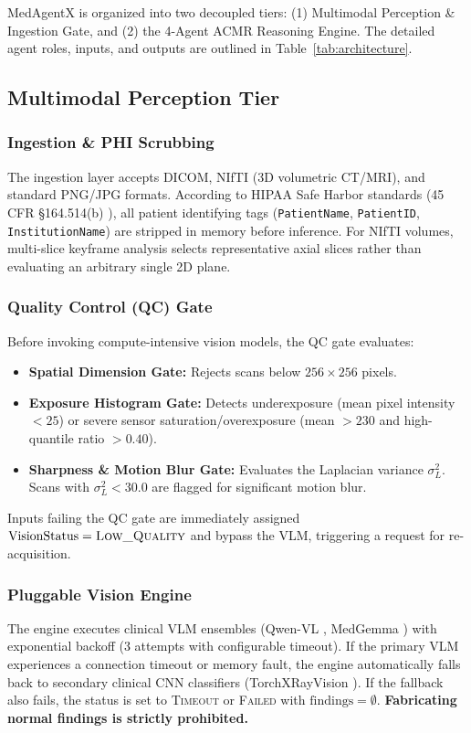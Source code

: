 \documentclass[journal,10pt,twocolumn]{IEEEtran}
\begin{document}
MedAgentX is organized into two decoupled tiers: (1) Multimodal Perception \& Ingestion Gate, and (2) the 4-Agent ACMR Reasoning Engine. The detailed agent roles, inputs, and outputs are outlined in Table~\ref{tab:architecture}.

\subsection{Multimodal Perception Tier}
\subsubsection{Ingestion \& PHI Scrubbing}
The ingestion layer accepts DICOM, NIfTI (3D volumetric CT/MRI), and standard PNG/JPG formats. According to HIPAA Safe Harbor standards (45 CFR \S 164.514(b) \cite{hipaa2002safeharbor}), all patient identifying tags (\texttt{PatientName}, \texttt{PatientID}, \texttt{InstitutionName}) are stripped in memory before inference. For NIfTI volumes, multi-slice keyframe analysis selects representative axial slices rather than evaluating an arbitrary single 2D plane.

\subsubsection{Quality Control (QC) Gate}
Before invoking compute-intensive vision models, the QC gate evaluates:
\begin{itemize}
    \item \textbf{Spatial Dimension Gate:} Rejects scans below $256 \times 256$ pixels.
    \item \textbf{Exposure Histogram Gate:} Detects underexposure (mean pixel intensity $< 25$) or severe sensor saturation/overexposure (mean $> 230$ and high-quantile ratio $> 0.40$).
    \item \textbf{Sharpness \& Motion Blur Gate:} Evaluates the Laplacian variance $\sigma^2_L$. Scans with $\sigma^2_L < 30.0$ are flagged for significant motion blur.
\end{itemize}
Inputs failing the QC gate are immediately assigned $\text{VisionStatus} = \textsc{Low\_Quality}$ and bypass the VLM, triggering a request for re-acquisition.

\subsubsection{Pluggable Vision Engine}
The engine executes clinical VLM ensembles (Qwen-VL \cite{bai2023qwenvl}, MedGemma \cite{medgemma2024}) with exponential backoff (3 attempts with configurable timeout). If the primary VLM experiences a connection timeout or memory fault, the engine automatically falls back to secondary clinical CNN classifiers (TorchXRayVision \cite{cohen2022torchxrayvision}). If the fallback also fails, the status is set to \textsc{Timeout} or \textsc{Failed} with $\text{findings} = \emptyset$. \textbf{Fabricating normal findings is strictly prohibited.}
\end{document}
